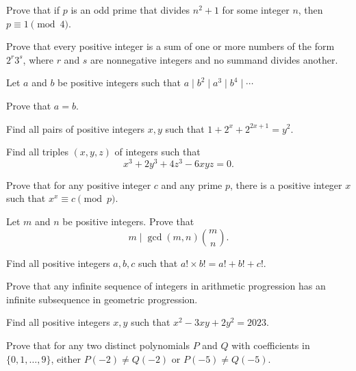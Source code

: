 \begin{result}{\label{r:n:n:pr:2}}
  Prove that if $p$ is an odd prime that divides $n^2+1$ for some integer
    $n$, then $p\equiv 1\pmod 4$.
\end{result}
\begin{problem}{\label{p:n:n:pr:25}}
      Prove that every positive integer is a sum of one or more numbers of
      the form $2^r3^s$, where $r$ and $s$ are nonnegative integers and no
      summand divides another.
\end{problem}
\begin{problem}{\label{p:n:n:pr:26}}
      Let $a$ and $b$ be positive integers such that $a\mid b^2\mid a^3\mid
      b^4\mid\cdots$

      Prove that $a=b$.
\end{problem}
\begin{problem}{\label{p:n:n:pr:27}}
  Find all pairs of positive integers $x,y$ such that
    $1+2^x+2^{2x+1}=y^2$.
\end{problem}
\begin{problem}{\label{p:n:n:pr:28}}
  Find all triples $(x, y, z)$ of integers such that
    \[x^3 + 2y^3 + 4z^3 - 6xyz = 0.\]
\end{problem}
\begin{problem}{\label{p:n:n:pr:29}}
  Prove that for any positive integer $c$ and any prime $p$, there is a
    positive integer $x$ such that $x^x\equiv c\pmod p$.
\end{problem}
\begin{problem}{\label{p:n:n:pr:30}}
      Let $m$ and $n$ be positive integers. Prove that
      \[m\mid\gcd(m,n)\binom mn.\]
\end{problem}
\begin{problem}{\label{p:n:n:pr:31}}
  Find all positive integers $a, b, c$ such that $a! \times b! = a! +
    b! + c!$.
\end{problem}
\begin{problem}{\label{p:n:n:pr:32}}
  Prove that any infinite sequence of integers in arithmetic progression has an
    infinite subsequence in geometric progression.
\end{problem}
\begin{problem}{\label{p:n:n:pr:33}}
  Find all positive integers $x, y$ such that $x^2-3xy+2y^2=2023$.
\end{problem}
\begin{problem}{\label{p:n:n:pr:34}}
  Prove that for any two distinct polynomials $P$ and $Q$ with coefficients in
    $\{0,1,\ldots,9\}$, either $P(-2)\ne Q(-2)$ or $P(-5)\ne Q(-5)$.
\end{problem}
